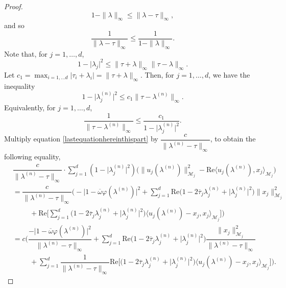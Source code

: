 \documentclass[10pt,a4paper]{amsart}
\begin{document}
\begin{proof}
$$1-\|\lambda\|_{\infty}\leq \|\lambda-\tau\|_{\infty},$$
and so
\begin{equation}\label{inequalitywithc-5}
\dfrac{1}{\|\lambda-\tau\|_{\infty}} \leq \dfrac{1}{1-\|\lambda\|_{\infty}}.
\end{equation}
Note that, for $j=1,\hdots, d$,
$$1-\lvert \lambda_{j}\rvert^{2} \leq \|\tau+\lambda\|_{\infty}\| \tau-\lambda\|_{\infty}.$$
Let $c_{1}=\max_{i=1,\hdots d} \lvert \tau_{i}+\lambda_{i}\rvert = \|\tau+\lambda\|_{\infty}$. Then, for $j=1,\hdots, d$, we have the inequality
\begin{equation}\label{ineqc1}
1-\lvert \lambda^{(n)}_{j}\rvert^{2} \leq c_{1}\|\tau -\lambda^{(n)}\|_{\infty}.
\end{equation}
Equivalently, for $j=1,\hdots, d$,
\begin{equation}\label{inequalityforc1}
\dfrac{1}{\|\tau-\lambda^{(n)}\|_{\infty}} \leq \dfrac{c_{1}}{1-\lvert \lambda^{(n)}_{j} \rvert^{2}}.
\end{equation}
Multiply equation \eqref{lastequationhereinthispart} by $\dfrac{c}{\|\lambda^{(n)}-\tau\|_{\infty}}$, to obtain the following equality, 
\begin{align}\label{equation527}
& \dfrac{c}{\|\lambda^{(n)}-\tau\|_{\infty}}\cdot\sum_{j=1}^{d}(1-\lvert \lambda^{(n)}_{j} \rvert^{2})\Big(\|u_{j}(\lambda^{(n)})\|_{\mathcal{M}_{j}}^{2}-\mathrm{Re} \langle u_{j}(\lambda^{(n)}),x_{j}\rangle_{\mathcal{M}_{j}} \Big)\nonumber\\
&=\dfrac{c}{\|\lambda^{(n)}-\tau\|_{\infty}} \Bigg(-\lvert1-\overline{\omega}\varphi(\lambda^{(n)})\rvert^{2}+\sum_{j=1}^{d}\mathrm{Re}\Big(1-2\overline{\tau}_{j}\lambda^{(n)}_{j}+\lvert\lambda^{(n)}_{j}\rvert^{2}\Big)\|x_{j}\|_{\mathcal{M}_{j}}^{2}
\nonumber\\
&\hspace{1cm}+\mathrm{Re}\bigg[\sum_{j=1}^{d}\Big(1-2\overline{\tau}_{j}\lambda^{(n)}_{j}+\lvert\lambda^{(n)}_{j}\rvert^{2}\Big)\langle u_{j}(\lambda^{(n)})-x_{j},x_{j}\rangle_{\mathcal{M}_{j}}\bigg]\Bigg)\nonumber\\
&=c\Bigg(\dfrac{-\lvert1-\overline{\omega}\varphi(\lambda^{(n)})\rvert^{2}}{\|\lambda^{(n)}-\tau\|_{\infty}}+\sum_{j=1}^{d}\mathrm{Re}\Big(1-2\overline{\tau}_{j}\lambda^{(n)}_{j}+\lvert\lambda^{(n)}_{j}\rvert^{2}\Big)\dfrac{\|x_{j}\|_{\mathcal{M}_{j}}^{2}}{\|\lambda^{(n)}-\tau\|_{\infty}}\nonumber\\
&\hspace{1cm}+\sum_{j=1}^{d}\dfrac{1}{\|\lambda^{(n)}-\tau\|_{\infty}}\mathrm{Re}\bigg[
\Big(1-2\overline{\tau}_{j}\lambda^{(n)}_{j}+\lvert\lambda^{(n)}_{j}\rvert^{2}\Big)\langle u_{j}(\lambda^{(n)})-x_{j},x_{j}\rangle_{\mathcal{M}_{j}}\bigg]\Bigg).
\end{align}


\end{proof}
\end{document}
